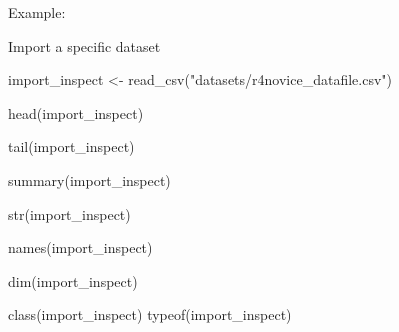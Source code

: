 \documentclass[
  letterpaper,
  DIV=11,
  numbers=noendperiod]{scrreprt}
\newenvironment{Shaded}{}{}
\newcommand{\FunctionTok}[1]{\textcolor[rgb]{0.44,0.26,0.76}{#1}}
\newcommand{\NormalTok}[1]{\textcolor[rgb]{0.14,0.16,0.18}{#1}}
\newcommand{\OtherTok}[1]{\textcolor[rgb]{0.44,0.26,0.76}{#1}}
\newcommand{\StringTok}[1]{\textcolor[rgb]{0.01,0.18,0.38}{#1}}
\begin{document}
Example:

Import a specific dataset

\begin{Shaded}
\begin{Highlighting}[]
\NormalTok{import\_inspect }\OtherTok{\textless{}{-}} \FunctionTok{read\_csv}\NormalTok{(}\StringTok{"datasets/r4novice\_datafile.csv"}\NormalTok{)}
\end{Highlighting}
\end{Shaded}

\begin{Shaded}
\begin{Highlighting}[]
\FunctionTok{head}\NormalTok{(import\_inspect)}
\end{Highlighting}
\end{Shaded}

\begin{Shaded}
\begin{Highlighting}[]
\FunctionTok{tail}\NormalTok{(import\_inspect)}
\end{Highlighting}
\end{Shaded}

\begin{Shaded}
\begin{Highlighting}[]
\FunctionTok{summary}\NormalTok{(import\_inspect)}
\end{Highlighting}
\end{Shaded}

\begin{Shaded}
\begin{Highlighting}[]
\FunctionTok{str}\NormalTok{(import\_inspect)}
\end{Highlighting}
\end{Shaded}

\begin{Shaded}
\begin{Highlighting}[]
\FunctionTok{names}\NormalTok{(import\_inspect)}
\end{Highlighting}
\end{Shaded}

\begin{Shaded}
\begin{Highlighting}[]
\FunctionTok{dim}\NormalTok{(import\_inspect)}
\end{Highlighting}
\end{Shaded}

\begin{Shaded}
\begin{Highlighting}[]
\FunctionTok{class}\NormalTok{(import\_inspect)}
\FunctionTok{typeof}\NormalTok{(import\_inspect)}
\end{Highlighting}
\end{Shaded}
\end{document}
